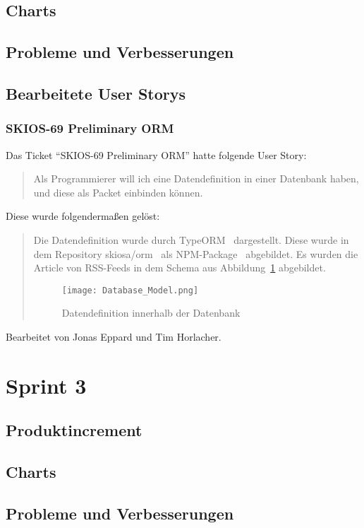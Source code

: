 \subsection{Charts}
\subsection{Probleme und Verbesserungen}


\subsection{Bearbeitete User Storys}

\subsubsection{SKIOS-69 Preliminary ORM}
Das Ticket \enquote{SKIOS-69 Preliminary ORM} hatte folgende User Story:
\begin{quotation}
    Als Programmierer will ich eine Datendefinition in einer Datenbank
    haben, und diese als Packet einbinden können.
\end{quotation}
Diese wurde folgendermaßen gelöst:
\begin{quotation}
Die Datendefinition wurde durch TypeORM~\parencite{web/TypeORM} dargestellt.
Diese wurde in dem Repository skiosa/orm~\parencite{git/skiosa/orm} als NPM-Package~\parencite{web/npm} abgebildet.
Es wurden die Article von RSS-Feeds in dem Schema aus Abbildung~\ref{fig:databaseORM} abgebildet.
\begin{figure}
    \texttt{[image: Database\_Model.png]}
    \caption{Datendefinition innerhalb der Datenbank}
    \label{fig:databaseORM}
\end{figure}
\end{quotation}
Bearbeitet von Jonas Eppard und Tim Horlacher.

\section{Sprint 3}

\subsection{Produktincrement}
\subsection{Charts}
\subsection{Probleme und Verbesserungen}


